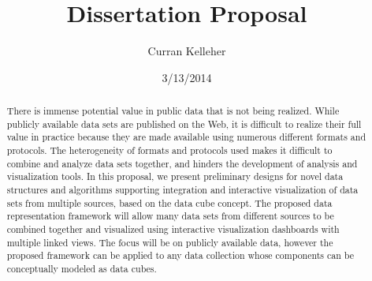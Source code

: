 \documentclass[12pt]{article}
\title{Dissertation Proposal}
\author{Curran Kelleher}
\date{3/13/2014}
\begin{document}
\maketitle 

\begin{onehalfspacing}
\begin{abstract}
There is immense potential value in public data that is not being realized. While publicly available data sets are published on the Web, it is difficult to realize their full value in practice because they are made available using numerous different formats and protocols. The heterogeneity of formats and protocols used makes it difficult to combine and analyze data sets together, and hinders the development of analysis and visualization tools. In this proposal, we present preliminary designs for novel data structures and algorithms supporting integration and interactive visualization of data sets from multiple sources, based on the data cube concept. The proposed data representation framework will allow many data sets from different sources to be combined together and visualized using interactive visualization dashboards with multiple linked views. The focus will be on publicly available data, however the proposed framework can be applied to any data collection whose components can be conceptually modeled as data cubes.
\end{abstract}
\end{onehalfspacing}

\pagebreak

\tableofcontents

\pagebreak
\end{document}
